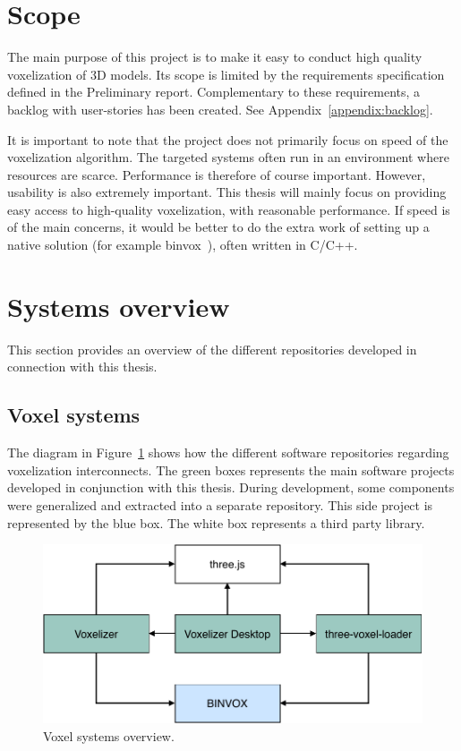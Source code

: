 \section{Scope}
The main purpose of this project is to make it easy to conduct high quality voxelization of 3D models. Its scope is limited by the requirements specification defined in the Preliminary report. Complementary to these requirements, a backlog with user-stories has been created. See Appendix~\ref{appendix:backlog}.

It is important to note that the project does not primarily focus on speed of the voxelization algorithm. The targeted systems often run in an environment where resources are scarce. Performance is therefore of course important. However, usability is also extremely important. This thesis will mainly focus on providing easy access to high-quality voxelization, with reasonable performance. If speed is of the main concerns, it would be better to do the extra work of setting up a native solution (for example binvox~\cite{binvox}), often written in C/C++.

\section{Systems overview}
This section provides an overview of the different repositories developed in connection with this thesis.
\subsection{Voxel systems}
The diagram in Figure~\ref{fig:voxel-systems-overview} shows how the different software repositories regarding voxelization interconnects. The green boxes represents the main software projects developed in conjunction with this thesis. During development, some components were generalized and extracted into a separate repository. This side project is represented by the blue box. The white box represents a third party library.
\begin{figure}[ht]
    \centering
    \includegraphics[page=1,scale=0.85]{sections/introduction/figures/voxel-systems-overview.pdf}
    \caption{Voxel systems overview.}
    \label{fig:voxel-systems-overview}
\end{figure}

